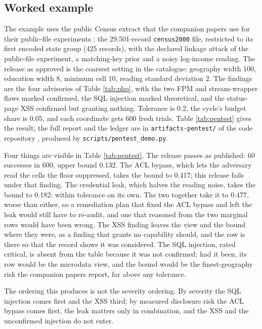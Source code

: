 \documentclass[11pt,a4paper]{article}
\begin{document}
\subsection{Worked example}
The example uses the public Census extract that the companion papers use for their public-file experiments \citep{mahomane2026long}: the 29,501-record \texttt{census2000} file, restricted to its first encoded state group (425 records), with the declared linkage attack of the public-file experiment, a matching-key prior and a noisy log-income reading. The release as approved is the coarsest setting in the catalogue: geography width 100, education width 8, minimum cell 10, reading standard deviation 2. The findings are the four advisories of Table \ref{tab:php}, with the two FPM and stream-wrapper flaws marked confirmed, the SQL injection marked theoretical, and the status-page XSS confirmed but granting nothing. Tolerance is 0.2, the cycle's budget share is 0.05, and each coordinate gets 600 fresh trials. Table \ref{tab:pentest} gives the result; the full report and the ledger are in \texttt{artifacts-pentest/} of the code repository \citep{privacyriskcode}, produced by \texttt{scripts/pentest\_demo.py}.



Four things are visible in Table \ref{tab:pentest}. The release passes as published: 60 successes in 600, upper bound 0.132. The ACL bypass, which lets the adversary read the cells the floor suppressed, takes the bound to 0.417; this release fails under that finding. The credential leak, which halves the reading noise, takes the bound to 0.182: within tolerance on its own. The two together take it to 0.477, worse than either, so a remediation plan that fixed the ACL bypass and left the leak would still have to re-audit, and one that reasoned from the two marginal rows would have been wrong. The XSS finding leaves the view and the bound where they were, as a finding that grants no capability should, and the row is there so that the record shows it was considered. The SQL injection, rated critical, is absent from the table because it was not confirmed; had it been, its row would be the microdata view, and the bound would be the finest-geography risk the companion papers report, far above any tolerance.

The ordering this produces is not the severity ordering. By severity the SQL injection comes first and the XSS third; by measured disclosure risk the ACL bypass comes first, the leak matters only in combination, and the XSS and the unconfirmed injection do not enter.
\end{document}
